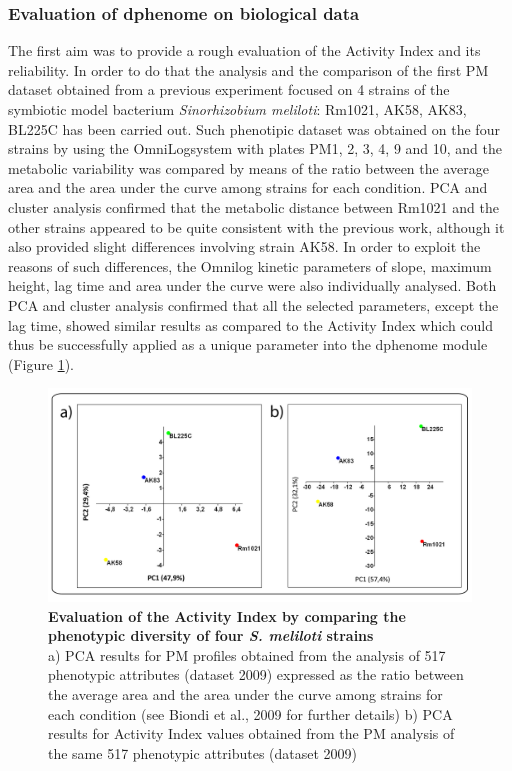 \subsubsection{Evaluation of dphenome on biological data}
The first aim was to provide a rough evaluation of the Activity Index and its reliability. In order to do that the analysis and the comparison of the first PM dataset obtained from a previous experiment focused on 4 strains of the symbiotic model bacterium \textit{Sinorhizobium meliloti}: Rm1021, AK58, AK83, BL225C \cite{biondi2009metabolic} has been carried out. Such phenotipic dataset was obtained on the four strains by using the OmniLog\texttrademark system with plates PM1, 2, 3, 4, 9 and 10, and the metabolic variability was compared by means of the ratio between the average area and the area under the curve among strains for each condition. PCA and cluster analysis confirmed that the metabolic distance between Rm1021 and the other strains appeared to be quite consistent with the previous work, although it also provided slight differences involving strain AK58. In order to exploit the reasons of such differences, the Omnilog kinetic parameters of slope, maximum height, lag time and area under the curve were also individually analysed. Both PCA and cluster analysis confirmed that all the selected parameters, except the lag time, showed similar results as compared to the Activity Index which could thus be successfully applied as a unique parameter into the dphenome module (Figure \ref{fig:dpca}).

\begin{figure}[!tb]
	\center
    \includegraphics[width=1\textwidth]{figures/2/thesis_23}
	\caption{\label{fig:dpca}\textbf{Evaluation of the Activity Index by comparing the phenotypic diversity of four \textit{S. meliloti} strains}\\
			a) PCA results for PM profiles obtained from the analysis of 517 phenotypic attributes (dataset 2009) expressed as the ratio between the average area and the area under the curve among strains for each condition (see Biondi et al., 2009 for further details)
			b) PCA results for Activity Index values obtained from the PM analysis of the same 517 phenotypic attributes (dataset 2009)}
\end{figure}

